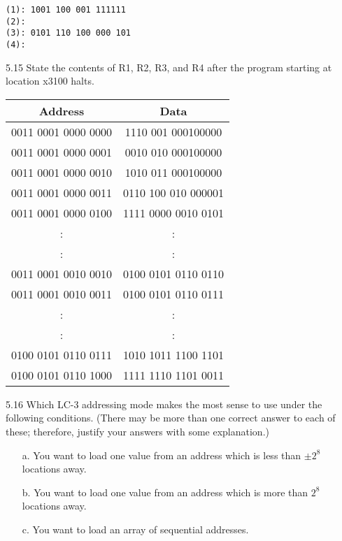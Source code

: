 \documentclass{patt}
\begin{document}
\begin{exercises}
\color{seventyblack}
\begin{Verbatim}[fontsize=\fontsize{9}{14}\selectfont]
(1): 1001 100 001 111111
(2):
(3): 0101 110 100 000 101
(4):
\end{Verbatim}
\normalcolor

\item[5.15] State the contents of R1, R2, R3, and R4 after the program
  starting at location x3100 halts.
\begin{center}
{\fontsize{9}{13pt}\selectfont
{\renewcommand{\tabcolsep}{6pt}
\begin{tabular}{@{}cc@{}}
\hline
{Address}\rule{0pt}{10.12pt}
& {Data} \\
\hline
           0011 0001 0000 0000 &  1110 001 000100000\rule{0pt}{10.1pt} \\[3pt]
           0011 0001 0000 0001 &  0010 010 000100000 \\[3pt]
           0011 0001 0000 0010 &  1010 011 000100000 \\[3pt]
           0011 0001 0000 0011 &  0110 100 010 000001 \\[3pt]
           0011 0001 0000 0100 &  1111 0000 0010 0101 \\[3pt]
             :   &  : \\[3pt]
             :   &  : \\[3pt]
           0011 0001 0010 0010 &  0100 0101 0110 0110 \\[3pt]
           0011 0001 0010 0011 &  0100 0101 0110 0111 \\[3pt]
             :   &  : \\[3pt]
             :   &  : \\[3pt]
           0100 0101 0110 0111 &  1010 1011 1100 1101 \\[3pt]
           0100 0101 0110 1000 &  1111 1110 1101 0011 \\[2.5pt]\hline
\end{tabular}}}
\end{center}
\vspace{-12pt}

\pagebreak

\item[5.16] Which LC-3 addressing mode makes the most sense to use
  under the following conditions. (There may be more than one correct
  answer to each of these; therefore, justify your answers with some
  explanation.)
\begin{enumerate}[a.]
\item[a.] You want to load one value from an address which is less
  than $\pm2^8$ locations away.
\item[b.] You want to load one value from an address which is more
  than $2^8$ locations away.
\item[c.] You want to load an array of sequential addresses.
\end{enumerate}


\end{exercises}
\end{document}
